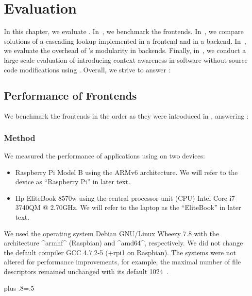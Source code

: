\chapter{Evaluation}
\label{chapter:evaluation}


\chapterhung

In this chapter, we evaluate \elektra{}.
In~, we benchmark the frontends.
In~, we compare solutions of a cascading lookup implemented in a frontend and in a backend.
In~, we evaluate the overhead of \elektra{}'s modularity in backends.
Finally, in~, we conduct a large-scale evaluation of introducing context awareness in software without source code modifications using \elektra{}.
Overall, we strive to answer :
\rqEvaluation*


\section{Performance of Frontends}
\label{sec:evaluation-frontends}

We benchmark the frontends in the order as they were introduced in , answering :
\rqEvaluationFrontend*



\subsection{Method}
\label{sec:hardware}
\label{sec:timer}

We measured the performance of applications using \elektra{} on two devices:
\begin{itemize}
\item 
Raspberry Pi\textsuperscript{\textregistered} Model B using the ARMv6 architecture.
We will refer to the device as ``Raspberry Pi'' in later text.
\item
Hp\textsuperscript{\textregistered} EliteBook 8570w using the central processor unit (CPU) Intel\textsuperscript{\textregistered} Core\textsuperscript{\texttrademark} i7-3740QM @ 2.70GHz.
We will refer to the laptop as the ``EliteBook'' in later text.
\end{itemize}
We used the operating system Debian GNU/Linux Wheezy 7.8 with the architecture ^armhf^ (Raspbian) and ^amd64^, respectively.
We did not change the default compiler GCC \mbox{4.7.2-5} (+rpi1 on Raspbian).
The systems were not altered for performance improvements, for example, the  maximal number of file descriptors remained unchanged with its default 1024~\cite{raab2015global}.%
{\parfillskip=0pt plus .8\textwidth \emergencystretch=.5\textwidth \par}

